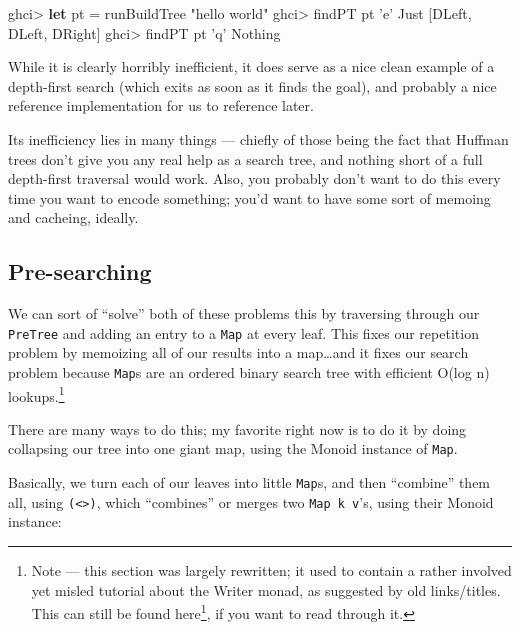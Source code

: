 \documentclass[]{article}
\newenvironment{Shaded}{\begin{snugshade}}{\end{snugshade}}
\newcommand{\CharTok}[1]{\textcolor[rgb]{0.31,0.60,0.02}{#1}}
\newcommand{\DataTypeTok}[1]{\textcolor[rgb]{0.13,0.29,0.53}{#1}}
\newcommand{\FunctionTok}[1]{\textcolor[rgb]{0.00,0.00,0.00}{#1}}
\newcommand{\KeywordTok}[1]{\textcolor[rgb]{0.13,0.29,0.53}{\textbf{#1}}}
\newcommand{\NormalTok}[1]{#1}
\newcommand{\StringTok}[1]{\textcolor[rgb]{0.31,0.60,0.02}{#1}}
\renewcommand{\href}[2]{#2\footnote{\url{#1}}}
\begin{document}
\begin{Shaded}
\begin{Highlighting}[]
\NormalTok{ghci}\FunctionTok{>} \KeywordTok{let}\NormalTok{ pt }\FunctionTok{=}\NormalTok{ runBuildTree }\StringTok{"hello world"}
\NormalTok{ghci}\FunctionTok{>}\NormalTok{ findPT pt }\CharTok{'e'}
\DataTypeTok{Just}\NormalTok{ [}\DataTypeTok{DLeft}\NormalTok{, }\DataTypeTok{DLeft}\NormalTok{, }\DataTypeTok{DRight}\NormalTok{]}
\NormalTok{ghci}\FunctionTok{>}\NormalTok{ findPT pt }\CharTok{'q'}
\DataTypeTok{Nothing}
\end{Highlighting}
\end{Shaded}

While it is clearly horribly inefficient, it does serve as a nice clean example
of a depth-first search (which exits as soon as it finds the goal), and probably
a nice reference implementation for us to reference later.

Its inefficiency lies in many things --- chiefly of those being the fact that
Huffman trees don't give you any real help as a search tree, and nothing short
of a full depth-first traversal would work. Also, you probably don't want to do
this every time you want to encode something; you'd want to have some sort of
memoing and cacheing, ideally.

\hypertarget{pre-searching}{%
\subsection{Pre-searching}\label{pre-searching}}

We can sort of ``solve'' both of these problems this by traversing through our
\texttt{PreTree} and adding an entry to a \texttt{Map} at every leaf. This fixes
our repetition problem by memoizing all of our results into a map\ldots{}and it
fixes our search problem because \texttt{Map}s are an ordered binary search tree
with efficient O(log n) lookups.\footnote{Note --- this section was largely
  rewritten; it used to contain a rather involved yet misled tutorial about the
  Writer monad, as suggested by old links/titles. This can
  \href{https://github.com/mstksg/inCode/blob/master/copy/entries/.huffman-2-writer.md}{still
  be found here}, if you want to read through it.}

There are many ways to do this; my favorite right now is to do it by doing
collapsing our tree into one giant map, using the Monoid instance of
\texttt{Map}.

Basically, we turn each of our leaves into little \texttt{Map}s, and then
``combine'' them all, using \texttt{(\textless{}\textgreater{})}, which
``combines'' or merges two \texttt{Map\ k\ v}'s, using their Monoid instance:
\end{document}

